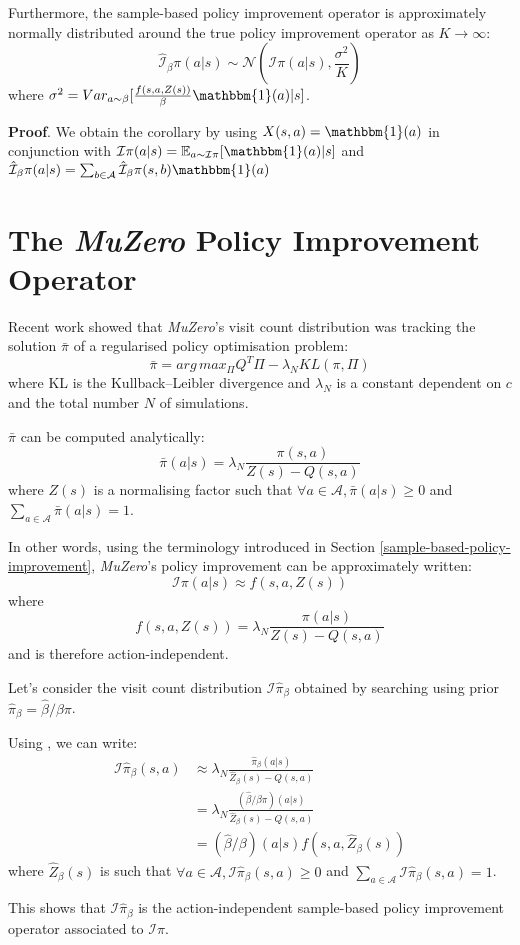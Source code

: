 \documentclass{article}
\newcommand{\muzero}{\emph{MuZero}}
\newcommand{\ipi}{\mathcal{I}\pi}
\newcommand{\sample}{\beta}
\newcommand{\ibpi}{\hat{\mathcal{I}}_{\sample}\pi}
\newcommand{\ihpi}{\mathcal{I}\hat{\pi}_\sample}
\begin{document}
Furthermore, the sample-based policy improvement operator is approximately normally distributed around the true policy improvement operator as $K\to\infty$:
$$\ibpi(a|s) \sim \mathcal{N}(\ipi(a|s), \frac{\sigma^2}{K})$$
where $\sigma^2 = Var_{a\sim\beta}[\frac{f(s, a, Z(s))}{\sample} \mathbbm{1}(a)|s]$.

\textbf{Proof}. We obtain the corollary by using $X(s,a)=\mathbbm{1}(a)$ in conjunction with
$\ipi(a|s)= \mathbb{E}_{a\sim\ipi}[\mathbbm{1}(a)|s]$ and $\ibpi(a|s)=\sum_{b\in\mathcal{A}} \ibpi(s, b) \mathbbm{1}(a)$

\section{The \muzero{} Policy Improvement Operator}
\label{mz-pi}
Recent work \cite{grill2020montecarlo} showed that \muzero{}'s visit count distribution was tracking the solution $\bar{\pi}$ of a regularised policy optimisation problem:
$$\bar{\pi} = arg\,max_\Pi  Q^T\Pi - \lambda_N KL(\pi, \Pi)$$
where KL is the Kullback–Leibler divergence and $\lambda_N$ is a constant dependent on $c$ and the total number $N$ of simulations.

$\bar{\pi}$ can be computed analytically:
$$\bar{\pi}(a|s) = \lambda_N \frac{\pi(s,a)}{Z(s) - Q(s,a)}$$
where $Z(s)$ is a normalising factor such that $\forall a\in\mathcal{A}, \bar{\pi}(a|s)\geq 0$ and $\sum_{a\in\mathcal{A}} \bar{\pi}(a|s)=1$.

In other words, using the terminology introduced in Section \ref{sample-based-policy-improvement}, \muzero{}'s policy improvement can be approximately written:
$$\ipi(a|s) \approx f(s, a, Z(s))$$
where
$$f(s, a, Z(s)) = \lambda_N \frac{\pi(a|s)}{Z(s) - Q(s,a)}$$
and is therefore action-independent.

Let's consider the visit count distribution $\ihpi$ obtained by searching using prior $\hat{\pi}_\sample=\hat{\sample}/\sample \pi$.

Using \cite{grill2020montecarlo}, we can write:
\begin{equation*}
\begin{split}
\ihpi(s, a)
& \approx \lambda_N \frac{\hat{\pi}_\sample(a|s)}{\hat{Z}_\sample(s) - Q(s,a)} \\
& = \lambda_N \frac{(\hat{\sample}/\sample \pi)(a|s)}{\hat{Z}_\sample(s) - Q(s,a)} \\
& = (\hat{\sample}/\sample)(a|s) f(s, a, \hat{Z}_\sample(s))
\end{split}
\end{equation*}
where $\hat{Z}_\sample(s)$ is such that $\forall a\in\mathcal{A}, \ihpi(s, a)\geq 0$ and $\sum_{a\in\mathcal{A}} \ihpi(s,a)=1$.

This shows that $\ihpi$ is the action-independent sample-based policy improvement operator associated to $\ipi$.
\end{document}
